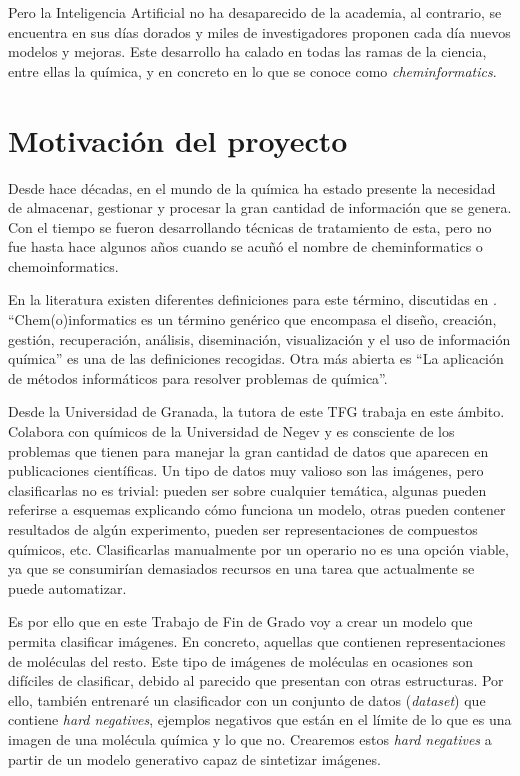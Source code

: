 Pero la Inteligencia Artificial no ha desaparecido de la academia, al contrario, se encuentra en sus días dorados y miles de investigadores proponen cada día nuevos modelos y mejoras. Este desarrollo ha calado en todas las ramas de la ciencia, entre ellas la química, y en concreto en lo que se conoce como \textit{cheminformatics}.

\section{Motivación del proyecto}
Desde hace décadas, en el mundo de la química ha estado presente la necesidad de almacenar, gestionar y procesar la gran cantidad de información que se genera. Con el tiempo se fueron desarrollando técnicas de tratamiento de esta, pero no fue hasta hace algunos años cuando se acuñó el nombre de cheminformatics o chemoinformatics. 

En la literatura existen diferentes definiciones para este término, discutidas en \cite{doi:10.1021/ci600234z}. ``Chem(o)informatics es un término genérico que encompasa el diseño, creación, gestión, recuperación, análisis, diseminación, visualización y el uso de información química'' es una de las definiciones recogidas. Otra más abierta es ``La aplicación de métodos informáticos para resolver problemas de química''. 

Desde la Universidad de Granada, la tutora de este TFG trabaja en este ámbito. Colabora con químicos de la Universidad de Negev y es consciente de los problemas que tienen para manejar la gran cantidad de datos que aparecen en publicaciones científicas. Un tipo de datos muy valioso son las imágenes, pero clasificarlas no es trivial: pueden ser sobre cualquier temática, algunas pueden referirse a esquemas explicando cómo funciona un modelo, otras pueden contener resultados de algún experimento, pueden ser representaciones de compuestos químicos, etc. Clasificarlas manualmente por un operario no es una opción viable, ya que se consumirían demasiados recursos en una tarea que actualmente se puede automatizar.

Es por ello que en este Trabajo de Fin de Grado voy a crear un modelo que permita clasificar imágenes. En concreto, aquellas que contienen representaciones de moléculas del resto. Este tipo de imágenes de moléculas en ocasiones son difíciles de clasificar, debido al parecido que presentan con otras estructuras. Por ello, también entrenaré un clasificador con un conjunto de datos (\textit{dataset}) que contiene \textit{hard negatives}, ejemplos negativos que están en el límite de lo que es una imagen de una molécula química y lo que no. Crearemos estos \textit{hard negatives} a partir de un modelo generativo capaz de sintetizar imágenes.

